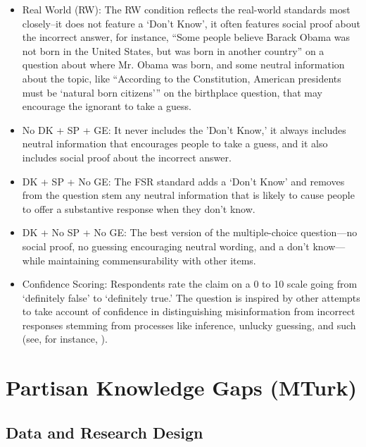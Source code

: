 \documentclass[12pt, letterpaper]{article}
\begin{document}
\begin{itemize}

	\item Real World (RW): The RW condition reflects the real-world standards most closely--it does not feature a `Don't Know', it often features social proof about the incorrect answer, for instance, ``Some people believe Barack Obama was not born in the United States, but was born in another country'' on a question about where Mr. Obama was born, and some neutral information about the topic, like ``According to the Constitution, American presidents must be `natural born citizens''' on the birthplace question, that may encourage the ignorant to take a guess.
	
	\item No DK +  SP + GE: It never includes the 'Don't Know,' it always includes neutral information that encourages people to take a guess, and it also includes social proof about the incorrect answer.
	
	\item DK + SP + No GE: The FSR standard adds a `Don't Know’ and removes from the question stem any neutral information that is likely to cause people to offer a substantive response when they don't know.
	
	\item DK + No SP + No GE: The best version of the multiple-choice question---no social proof, no guessing encouraging neutral wording, and a don't know---while maintaining commensurability with other items. 
	
	\item Confidence Scoring: Respondents rate the claim on a 0 to 10 scale going from `definitely false' to `definitely true.' The question is inspired by other attempts to take account of confidence in distinguishing misinformation from incorrect responses stemming from processes like inference, unlucky guessing, and such (see, for instance, \citep{pasek2015}).

\end{itemize}

\section*{Partisan Knowledge Gaps (MTurk)}
\subsection*{Data and Research Design}\label{sec:data}
\end{document}
